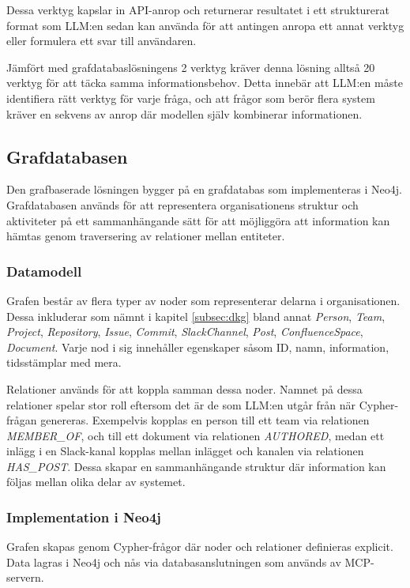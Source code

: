 Dessa verktyg kapslar in API-anrop och returnerar resultatet i ett strukturerat format som LLM:en sedan kan använda för att antingen anropa ett annat verktyg eller formulera ett svar till användaren.

Jämfört med grafdatabaslösningens 2 verktyg kräver denna lösning alltså 20 verktyg för att täcka samma informationsbehov.
Detta innebär att LLM:en måste identifiera rätt verktyg för varje fråga, och att frågor som berör flera system kräver en sekvens av anrop där modellen själv kombinerar informationen.

\subsection{Grafdatabasen}\label{subsec:overview3}
Den grafbaserade lösningen bygger på en grafdatabas som implementeras i Neo4j.
Grafdatabasen används för att representera organisationens struktur och aktiviteter på ett sammanhängande sätt för att möjliggöra att information kan hämtas genom traversering av relationer mellan entiteter.

\subsubsection{Datamodell}

Grafen består av flera typer av noder som representerar delarna i organisationen. Dessa inkluderar som nämnt i kapitel \ref{subsec:dkg} bland annat \textit{Person}, \textit{Team}, 
\textit{Project}, \textit{Repository}, \textit{Issue}, \textit{Commit}, 
\textit{SlackChannel}, \textit{Post}, \textit{ConfluenceSpace},
\textit{Document}. Varje nod i sig innehåller egenskaper såsom ID, namn, information, tidsstämplar med mera.

Relationer används för att koppla samman dessa noder. Namnet på dessa relationer spelar stor roll eftersom det är de som LLM:en utgår från när Cypher-frågan genereras.
Exempelvis kopplas en person till ett team via relationen \textit{MEMBER\_OF}, och till ett dokument via relationen \textit{AUTHORED}, medan ett inlägg i en Slack-kanal kopplas mellan inlägget och kanalen via relationen \textit{HAS\_POST}.
Dessa skapar en sammanhängande struktur där information kan följas mellan olika delar av systemet.

\subsubsection{Implementation i Neo4j}
Grafen skapas genom Cypher-frågor där noder och relationer definieras explicit.
Data lagras i Neo4j och nås via databasanslutningen som används av MCP-servern.

